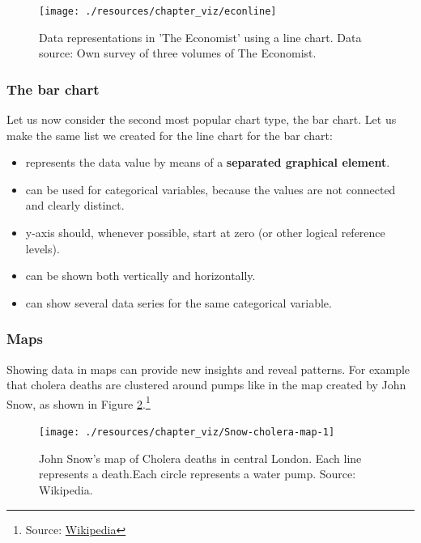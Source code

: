 \documentclass[
]{book}
\providecommand{\tightlist}{%
  \setlength{\itemsep}{0pt}\setlength{\parskip}{0pt}}
\begin{document}
\begin{figure}

{\centering \texttt{[image: ./resources/chapter\_viz/econline]} 

}

\caption{Data representations in 'The Economist' using a line chart. Data source: Own survey  of three volumes of The Economist.}\label{fig:viz10}
\end{figure}

\hypertarget{the-bar-chart}{%
\subsubsection*{The bar chart}\label{the-bar-chart}}

Let us now consider the second most popular chart type, the bar chart. Let us make the same list we created for the line chart for the bar chart:

\begin{itemize}
\tightlist
\item
  represents the data value by means of a \textbf{separated graphical element}.
\item
  can be used for categorical variables, because the values are not connected and clearly distinct.
\item
  y-axis should, whenever possible, start at zero (or other logical reference levels).
\item
  can be shown both vertically and horizontally.
\item
  can show several data series for the same categorical variable.
\end{itemize}

\hypertarget{maps}{%
\subsubsection*{Maps}\label{maps}}

Showing data in maps can provide new insights and reveal patterns. For example that cholera deaths are clustered around pumps like in the map created by John Snow, as shown in Figure \ref{fig:viz155}.\footnote{Source: \href{https://en.wikipedia.org/wiki/John_Snow\#/media/File:Snow-cholera-map-1.jpg}{Wikipedia}}

\begin{figure}

{\centering \texttt{[image: ./resources/chapter\_viz/Snow-cholera-map-1]} 

}

\caption{John Snow's map of Cholera deaths in central London. Each line represents a death.Each circle represents a water pump. Source: Wikipedia.}\label{fig:viz155}
\end{figure}
\end{document}
